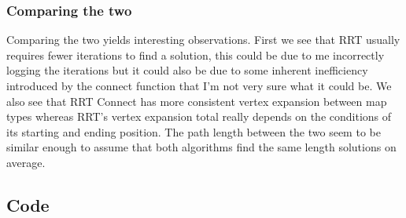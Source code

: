 \documentclass{article}
\begin{document}
\subsubsection{Comparing the two}\label{sec:Comparing the two} %
Comparing the two yields interesting observations. First we see that RRT 
usually requires fewer iterations to find a solution, this could be due to me 
incorrectly logging the iterations but it could also be due to some inherent 
inefficiency introduced by the connect function that I'm not very sure what it
could be. We also see that RRT Connect has more consistent vertex expansion between 
map types whereas RRT's vertex expansion total really depends on the conditions 
of its starting and ending position. The path length between the two seem to be similar
enough to assume that both algorithms find the same length solutions on average.

	
\subsection{Code}\label{sub:Code 2} %
\end{document}
